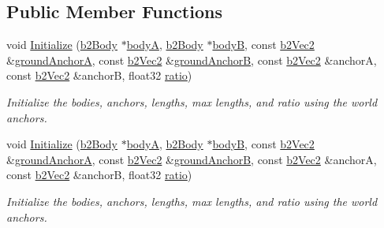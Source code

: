 \subsection*{Public Member Functions}
\begin{DoxyCompactItemize}
\item 
\mbox{\label{structb2PulleyJointDef_abef614a93562b82aa3b5f8cac17d1ce8}} 
void \hyperlink{structb2PulleyJointDef_abef614a93562b82aa3b5f8cac17d1ce8}{Initialize} (\hyperlink{classb2Body}{b2\+Body} $\ast$\hyperlink{structb2JointDef_a592b8e186f5f0d8848ef6b7ce77f0f70}{bodyA}, \hyperlink{classb2Body}{b2\+Body} $\ast$\hyperlink{structb2JointDef_a3d1a39831332b8c5a41611c06396480a}{bodyB}, const \hyperlink{structb2Vec2}{b2\+Vec2} \&\hyperlink{structb2PulleyJointDef_aae77c020ce4629ab9e03560e28aa853d}{ground\+AnchorA}, const \hyperlink{structb2Vec2}{b2\+Vec2} \&\hyperlink{structb2PulleyJointDef_aa412b9f3bffd1fb69ace14f9b3e03b82}{ground\+AnchorB}, const \hyperlink{structb2Vec2}{b2\+Vec2} \&anchorA, const \hyperlink{structb2Vec2}{b2\+Vec2} \&anchorB, float32 \hyperlink{structb2PulleyJointDef_af35074246aeacbf239c11682642b31f5}{ratio})
\begin{DoxyCompactList}\small\item\em Initialize the bodies, anchors, lengths, max lengths, and ratio using the world anchors. \end{DoxyCompactList}\item 
\mbox{\label{structb2PulleyJointDef_abef614a93562b82aa3b5f8cac17d1ce8}} 
void \hyperlink{structb2PulleyJointDef_abef614a93562b82aa3b5f8cac17d1ce8}{Initialize} (\hyperlink{classb2Body}{b2\+Body} $\ast$\hyperlink{structb2JointDef_a592b8e186f5f0d8848ef6b7ce77f0f70}{bodyA}, \hyperlink{classb2Body}{b2\+Body} $\ast$\hyperlink{structb2JointDef_a3d1a39831332b8c5a41611c06396480a}{bodyB}, const \hyperlink{structb2Vec2}{b2\+Vec2} \&\hyperlink{structb2PulleyJointDef_aae77c020ce4629ab9e03560e28aa853d}{ground\+AnchorA}, const \hyperlink{structb2Vec2}{b2\+Vec2} \&\hyperlink{structb2PulleyJointDef_aa412b9f3bffd1fb69ace14f9b3e03b82}{ground\+AnchorB}, const \hyperlink{structb2Vec2}{b2\+Vec2} \&anchorA, const \hyperlink{structb2Vec2}{b2\+Vec2} \&anchorB, float32 \hyperlink{structb2PulleyJointDef_af35074246aeacbf239c11682642b31f5}{ratio})
\begin{DoxyCompactList}\small\item\em Initialize the bodies, anchors, lengths, max lengths, and ratio using the world anchors. \end{DoxyCompactList}\end{DoxyCompactItemize}
